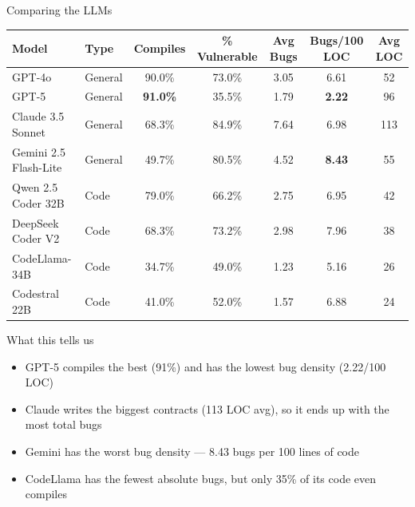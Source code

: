\documentclass[aspectratio=169]{beamer}
\begin{document}
\begin{frame}{Comparing the LLMs}
\begin{center}
\small
\begin{tabular}{@{}llccccc@{}}
\toprule
\textbf{Model} & \textbf{Type} & \textbf{Compiles} & \textbf{\% Vulnerable} & \textbf{Avg Bugs} & \textbf{Bugs/100 LOC} & \textbf{Avg LOC} \\
\midrule
GPT-4o              & General & 90.0\% & 73.0\% & 3.05 & 6.61 & 52 \\
GPT-5               & General & \textbf{91.0\%} & 35.5\% & 1.79 & \textbf{2.22} & 96 \\
Claude 3.5 Sonnet   & General & 68.3\% & 84.9\% & 7.64 & 6.98 & 113 \\
Gemini 2.5 Flash-Lite & General & 49.7\% & 80.5\% & 4.52 & \textbf{8.43} & 55 \\
\midrule
Qwen 2.5 Coder 32B  & Code & 79.0\% & 66.2\% & 2.75 & 6.95 & 42 \\
DeepSeek Coder V2   & Code & 68.3\% & 73.2\% & 2.98 & 7.96 & 38 \\
CodeLlama-34B       & Code & 34.7\% & 49.0\% & 1.23 & 5.16 & 26 \\
Codestral 22B       & Code & 41.0\% & 52.0\% & 1.57 & 6.88 & 24 \\
\bottomrule
\end{tabular}
\end{center}

\vspace{0.3cm}
\begin{block}{What this tells us}
\begin{itemize}\small
    \item GPT-5 compiles the best (91\%) and has the lowest bug density (2.22/100 LOC)
    \item Claude writes the biggest contracts (113 LOC avg), so it ends up with the most total bugs
    \item Gemini has the worst bug density --- 8.43 bugs per 100 lines of code
    \item CodeLlama has the fewest absolute bugs, but only 35\% of its code even compiles
\end{itemize}
\end{block}
\end{frame}
\end{document}
